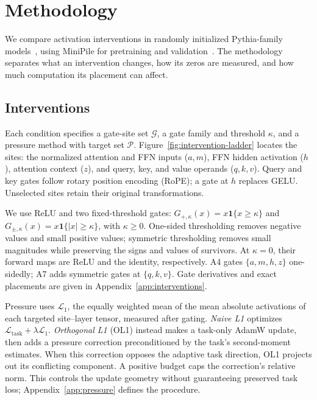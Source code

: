 \section{Methodology}
\label{sec:methodology}

We compare activation interventions in randomly initialized Pythia-family
models~\citep{biderman2023pythia}, using MiniPile for pretraining and
validation~\citep{kaddour2023minipile}. The methodology separates what an
intervention changes, how its zeros are measured, and how much computation
its placement can affect.

\subsection{Interventions}
\label{sec:interventions}

Each condition specifies a gate-site set $\mathcal{G}$, a gate family and
threshold $\kappa$, and a pressure method with target set $\mathcal{P}$.
Figure~\ref{fig:intervention-ladder} locates the sites: the normalized attention
and FFN inputs ($a,m$), FFN hidden activation ($h$), attention context ($z$),
and query, key, and value operands ($q,k,v$). Query and key gates follow rotary
position encoding (RoPE); a gate at $h$ replaces GELU. Unselected sites retain
their original transformations.

We use ReLU and two fixed-threshold gates:
$G_{+,\kappa}(x)=x\mathbf{1}\{x\geq\kappa\}$ and
$G_{\pm,\kappa}(x)=x\mathbf{1}\{|x|\geq\kappa\}$, with $\kappa\geq0$.
One-sided thresholding removes negative values and small positive values;
symmetric thresholding removes small magnitudes while preserving the signs
and values of survivors. At $\kappa=0$, their forward maps are ReLU and the
identity, respectively. A4 gates $\{a,m,h,z\}$ one-sidedly; A7 adds symmetric
gates at $\{q,k,v\}$. Gate derivatives and exact placements are given in
Appendix~\ref{app:interventions}.

Pressure uses $\mathcal{L}_1$, the equally weighted mean of the mean absolute
activations of each targeted site--layer tensor, measured after gating.
\emph{Naive L1} optimizes $\mathcal{L}_{\mathrm{task}}+\lambda\mathcal{L}_1$.
\emph{Orthogonal L1} (OL1) instead makes a task-only AdamW update, then adds
a pressure correction preconditioned by the task's second-moment estimates.
When this correction opposes the adaptive task direction, OL1 projects out
its conflicting component. A positive budget caps the correction's relative norm.
This controls the update geometry without guaranteeing preserved task loss;
Appendix~\ref{app:pressure} defines the procedure.

